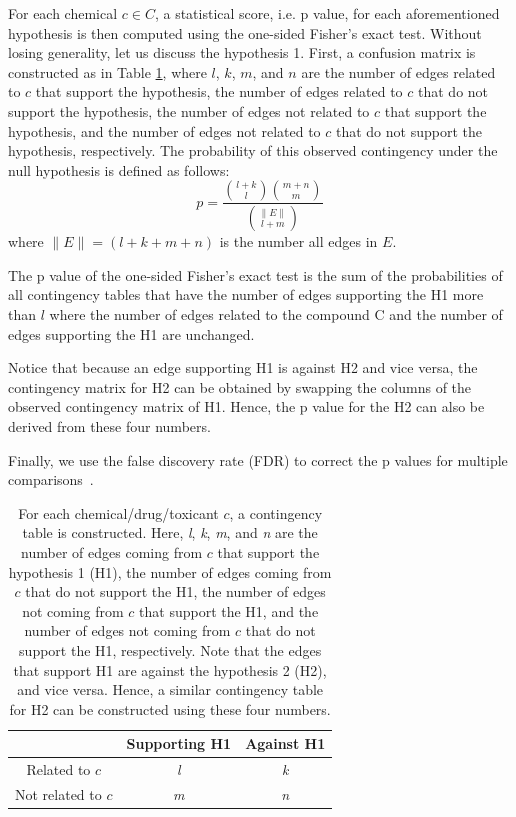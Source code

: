 For each chemical $c \in C$, a statistical score, i.e. p value, for each aforementioned hypothesis is then computed using the one-sided Fisher's exact test. Without losing generality, let us discuss the hypothesis 1. First, a confusion matrix is constructed as in Table \ref{ConfusionMatrix}, where $l$, $k$, $m$, and $n$ are the number of edges related to $c$ that support the hypothesis, the number of edges related to $c$ that do not support the hypothesis, the number of edges not related to $c$ that support the hypothesis, and the number of edges not related to $c$ that do not support the hypothesis, respectively. 
The probability of this observed contingency under the null hypothesis is defined as follows:
\begin{equation}
p = \frac{ {l+k \choose l}{m+n \choose m}}{{\|E\| \choose l + m}}
\end{equation}
where $\|E\| = (l+k+m+n)$ is the number all edges in $E$. 

The p value of the one-sided Fisher's exact test is the sum of the probabilities of all contingency tables that have the number of edges supporting the H1 more than $l$ where the number of edges related to the compound C and the number of edges supporting the H1 are unchanged.

Notice that because an edge supporting H1 is against H2 and vice versa, the contingency matrix for H2 can be obtained by swapping the columns of the observed contingency matrix of H1. Hence, the p value for the H2 can also be derived from these four numbers.


Finally, we use the false discovery rate (FDR) to correct the p values for multiple comparisons~\cite{Benjamini:1997}.

\begin{table}
\caption{For each chemical/drug/toxicant $c$, a contingency table is constructed. Here, \emph{l}, \emph{k}, \emph{m}, and \emph{n} are the number of edges coming from $c$ that support the hypothesis 1 (H1), the number of edges coming from $c$ that do not support the H1, the number of edges not coming from $c$ that support the H1, and the number of edges not coming from $c$ that do not support the H1, respectively. Note that the edges that support H1 are against the hypothesis 2 (H2), and vice versa. Hence, a similar contingency table for H2 can be constructed using these four numbers.}
\begin{center}
\begin{tabular}{c|cc}
&  Supporting H1& Against H1\\
\hline
Related to $c$& \emph{l} & \emph{k} \\
 Not related to $c$&\emph{m}& \emph{n}  \\
\end{tabular}
\end{center}
\label{ConfusionMatrix}
\end{table}%


